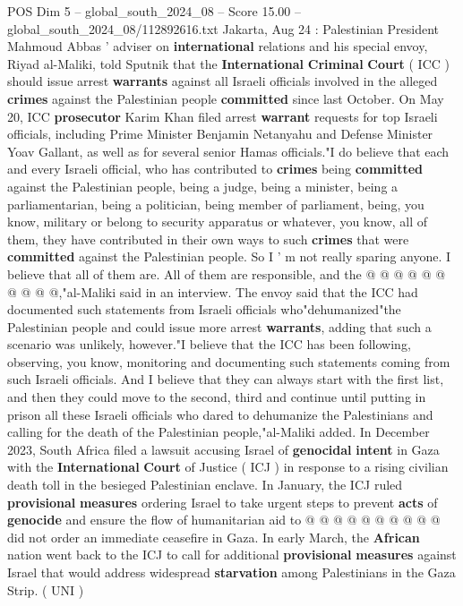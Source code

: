 \begin{textsample}{POS Dim 5 – global\_south\_2024\_08 – Score 15.00 – global\_south\_2024\_08/112892616.txt}  \label{ex:f5_pos_322}
Jakarta, Aug 24 : Palestinian President Mahmoud Abbas ' adviser on \textbf{international} relations and his special envoy, Riyad al-Maliki, told Sputnik that the \textbf{International} \textbf{Criminal} \textbf{Court} ( ICC ) should issue arrest \textbf{warrants} against all Israeli officials involved in the alleged \textbf{crimes} against the Palestinian people \textbf{committed} since last October.
On May 20, ICC \textbf{prosecutor} Karim Khan filed arrest \textbf{warrant} requests for top Israeli officials, including Prime Minister Benjamin Netanyahu and Defense Minister Yoav Gallant, as well as for several senior Hamas officials."I do believe that each and every Israeli official, who has contributed to \textbf{crimes} being \textbf{committed} against the Palestinian people, being a judge, being a minister, being a parliamentarian, being a politician, being member of parliament, being, you know, military or belong to security apparatus or whatever, you know, all of them, they have contributed in their own ways to such \textbf{crimes} that were \textbf{committed} against the Palestinian people.
So I ' m not really sparing anyone.
I believe that all of them are.
All of them are responsible, and the @ @ @ @ @ @ @ @ @ @,"al-Maliki said in an interview.
The envoy said that the ICC had documented such statements from Israeli officials who"dehumanized"the Palestinian people and could issue more arrest \textbf{warrants}, adding that such a scenario was unlikely, however."I believe that the ICC has been following, observing, you know, monitoring and documenting such statements coming from such Israeli officials.
And I believe that they can always start with the first list, and then they could move to the second, third and continue until putting in prison all these Israeli officials who dared to dehumanize the Palestinians and calling for the death of the Palestinian people,"al-Maliki added.
In December 2023, South Africa filed a lawsuit accusing Israel of \textbf{genocidal} \textbf{intent} in Gaza with the \textbf{International} \textbf{Court} of Justice ( ICJ ) in response to a rising civilian death toll in the besieged Palestinian enclave.
In January, the ICJ ruled \textbf{provisional} \textbf{measures} ordering Israel to take urgent steps to prevent \textbf{acts} of \textbf{genocide} and ensure the flow of humanitarian aid to @ @ @ @ @ @ @ @ @ @ did not order an immediate ceasefire in Gaza.
In early March, the \textbf{African} nation went back to the ICJ to call for additional \textbf{provisional} \textbf{measures} against Israel that would address widespread \textbf{starvation} among Palestinians in the Gaza Strip. ( UNI )

\end{textsample}
